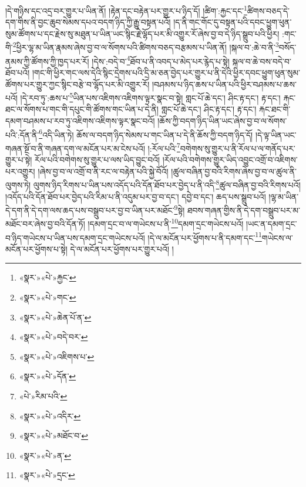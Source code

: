 །དེ་གཉིས་དང་འདྲ་བར་གྱུར་པ་ཡིན་ནོ། །རྟེན་དང་བརྟེན་པར་གྱུར་པ་ཉིད་དོ། །ཚིག་:རྐྱང་དང་\footnote{«སྣར་»«པེ་»རྐྱང་}ཚིགས་བཅད་དེ་དག་གིས་ནི་བྱང་ཆུབ་སེམས་དཔའ་བདག་ཉིད་ཀྱི་རྒྱུ་བསྟན་པའོ། །ད་ནི་གང་གོང་དུ་བསྟན་པའི་དབང་ཕྱུག་ཕུན་སུམ་ཚོགས་པ་དང་རྗེས་སུ་མཐུན་པ་ཡིན་ཡང་སྙིང་རྗེ་ལྷོད་པར་མི་འགྱུར་རོ་ཞེས་བྱ་བ་དེ་ཉིད་སྒྲུབ་པའི་ཕྱིར། :གང་གི་\footnote{«སྣར་»«པེ་»གང་}ཕྱིར་ལྷ་མ་ཡིན་རྣམས་ཞེས་བྱ་བ་ལ་སོགས་པའི་ཚིགས་བཅད་བརྩམས་པ་ཡིན་ནོ། །སྐལ་བ་:ཆེ་བ་ནི་\footnote{«སྣར་»«པེ་»ཆེན་པོ་ན་}བསོད་ནམས་ཀྱི་ཚོགས་ཀྱི་ཁྱད་པར་རོ། །དེས་:བདེ་བ་\footnote{«སྣར་»«པེ་»བདེ་བར་}ཐོབ་པ་ནི་འབད་པ་མེད་པར་རྙེད་པ་སྟེ། སྐལ་བ་ཆེ་བས་བདེ་བ་ཐོབ་པའོ། །གང་གི་ཕྱིར་གང་ལས་དེའི་སྙིང་དྲེགས་པའི་དྲི་མ་ཅན་བྱེད་པར་གྱུར་པ་ནི་དེའི་ཕྱིར་དབང་ཕྱུག་ཕུན་སུམ་ཚོགས་པར་གྱུར་ཀྱང་སྙིང་བརྩེ་བ་ལྷོད་པར་མི་འགྱུར་རོ། །བཤམས་པ་ཉིད་ཆས་པ་ཡིན་པའི་ཕྱིར་བཤམས་པ་ཆས་པའོ། །དེ་རབ་ཏུ་:ཆས་པ་\footnote{«སྣར་»«པེ་»འཇིགས་པ་}ཡིན་པས་འཇིགས་འཇིགས་ལྟར་སྣང་བ་སྟེ། གླང་པོ་ཆེ་དང་། ཤིང་རྟ་དང་། རྟ་དང་། རྐང་ཐང་ལ་སོགས་པ་གང་གི་དཔུང་གི་ཚོགས་གང་ཡིན་པ་དེ་ནི། གླང་པོ་ཆེ་དང་། ཤིང་རྟ་དང་། རྟ་དང་། རྐང་ཐང་གི་དམག་བཤམས་པ་རབ་ཏུ་འཇིགས་འཇིགས་ལྟར་སྣང་བའོ། །ཆོས་ཀྱི་བདག་ཉིད་ཡིན་ཡང་ཞེས་བྱ་བ་ལ་སོགས་པའི་:དོན་ནི་\footnote{«སྣར་»«པེ་»དོན་}འདི་ཡིན་ཏེ། ཆོས་ལ་བདག་ཉིད་སེམས་པ་གང་ཡིན་པ་དེ་ནི་ཆོས་ཀྱི་བདག་ཉིད་དོ། །དེ་ལྟ་ཡིན་ཡང་གཞན་སྔོ་བ་ནི་གཞན་དག་ལ་མངོན་པར་མ་ངེས་པའོ། །:རོལ་པའི་\footnote{«པེ་»རིམ་པའི་}བགེགས་སུ་གྱུར་པ་ནི་རོལ་པ་ལ་གནོད་པར་གྱུར་པ་སྟེ། རོལ་པའི་བགེགས་སུ་གྱུར་པ་ལས་ཡིད་བྱུང་བའོ། །རོལ་པའི་བགེགས་གྱུར་ཡིད་འབྱུང་འགྲོ་བ་འཇིགས་པར་འགྱུར། །ཞེས་བྱ་བ་ལ་འགྲོ་བ་ནི་རང་ལ་བརྟེན་པའི་སྐྱེ་བོའོ། །ཚུལ་བཞིན་བྱ་བའི་རིགས་ཞེས་བྱ་བ་ལ་ཚུལ་ནི་ལུགས་ཏེ། ལུགས་ཉིད་རིགས་པ་ཡིན་པས་འདོད་པའི་དོན་ཐོབ་པར་བྱེད་པ་ནི་འདི་\footnote{«སྣར་»«པེ་»འདིར་}ཚུལ་བཞིན་བྱ་བའི་རིགས་པའོ། །འདོད་པའི་དོན་ཐོབ་པར་བྱེད་པའི་རིམ་པ་ནི་འདུམ་པར་བྱ་བ་དང་། དབྱེ་བ་དང་། ཆད་པས་སྒྲུབ་པའོ། །ལྷ་མ་ཡིན་དེ་དག་ནི་དེ་དག་ལས་ཆད་པས་བསྒྲུབ་པར་བྱ་བ་ཡིན་པར་མཐོང་\footnote{«སྣར་»«པེ་»མཐོང་བ་}སྟེ། ཐབས་གཞན་གྱིས་ནི་དེ་དག་བསྒྲུབ་པར་མ་མཐོང་བར་ཞེས་བྱ་བའི་དོན་ཏོ། །དམག་དྲང་བ་ལ་གཡེངས་པ་ནི་\footnote{«སྣར་»«པེ་»ན་}དམག་དྲང་གཡེངས་པའོ། །ཡང་ན་དམག་དྲང་བ་ཉིད་གཡེངས་པ་ཡིན་པས་དམག་དྲང་གཡེངས་པའོ། །དེ་ལ་མངོན་པར་ཕྱོགས་པ་ནི་དམག་དང་\footnote{«སྣར་»«པེ་»དྲང་}གཡེངས་ལ་མངོན་པར་ཕྱོགས་པ་སྟེ། དེ་ལ་མངོན་པར་ཕྱོགས་པར་གྱུར་པའོ། །
